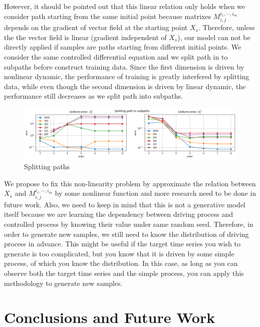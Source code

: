 \documentclass[12pt]{report}
\theoremstyle{definition}
\theoremstyle{remark}
\begin{document}
However, it should be pointed out that this linear relation only holds when we consider path starting from the same initial point because matrixes $M^{i_{1},\cdots,i_{m}}_{i,j}$ depends on the gradient of vector field at the starting point $X_{s}$. Therefore, unless the the vector field is linear (gradient independent of $X_{s}$), our model can not be directly applied if samples are paths starting from different initial points. We consider the same controlled differential equation and we split path in to subpaths before construct training data. Since the first dimension is driven by nonlinear dynamic, the performance of training is greatly interfered by splitting data, while even though the second dimension is driven by linear dynamic, the performance still decreases as we split path into subpaths. 
\begin{figure}[H]
  \centering
  \includegraphics[width=\textwidth]{figs/res7.png}
  \caption{Splitting paths}
\end{figure}
We propose to fix this non-linearity problem by approximate the relation between $X_{s}$ and $M^{i_{1},\cdots,i_{m}}_{i,j}$ by some nonlinear function and more research need to be done in future work. Also, we need to keep in mind that this is not a generative model itself because we are learning the dependency between driving process and controlled process by knowing their value under same random seed. Therefore, in order to generate new samples, we still need to know the distribution of driving process in advance. This might be useful if the target time series you wish to generate is too complicated, but you know that it is driven by some simple process, of which you know the distribution. In this case, as long as you can observe both the target time series and the simple process, you can apply this methodology to generate new samples.

\chapter{Conclusions and Future Work}


\nocite{*}


\end{document}
